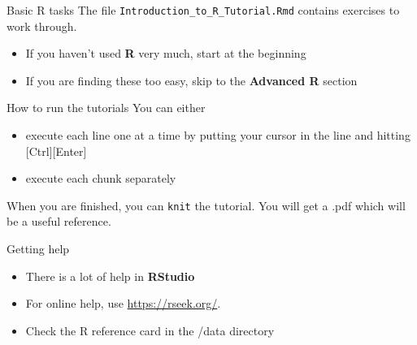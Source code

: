 \documentclass[
  ignorenonframetext,
  aspectratio=169]{beamer}
\providecommand{\tightlist}{%
  \setlength{\itemsep}{0pt}\setlength{\parskip}{0pt}}
\begin{document}
\begin{frame}[fragile]{Basic R tasks}
\protect\hypertarget{basic-r-tasks}{}
The file \texttt{Introduction\_to\_R\_Tutorial.Rmd} contains exercises
to work through.

\begin{itemize}
\tightlist
\item
  If you haven't used \textbf{R} very much, start at the beginning
\item
  If you are finding these too easy, skip to the \textbf{Advanced R}
  section
\end{itemize}
\end{frame}

\begin{frame}[fragile]{How to run the tutorials}
\protect\hypertarget{how-to-run-the-tutorials}{}
You can either

\begin{itemize}
\tightlist
\item
  execute each line one at a time by putting your cursor in the line and
  hitting {[}Ctrl{]}{[}Enter{]}
\item
  execute each chunk separately
\end{itemize}

When you are finished, you can \texttt{knit} the tutorial. You will get
a .pdf which will be a useful reference.
\end{frame}

\begin{frame}{Getting help}
\protect\hypertarget{getting-help}{}
\begin{itemize}
\tightlist
\item
  There is a lot of help in \textbf{RStudio}
\item
  For online help, use \url{https://rseek.org/}.
\item
  Check the R reference card in the /data directory
\end{itemize}
\end{frame}
\end{document}
